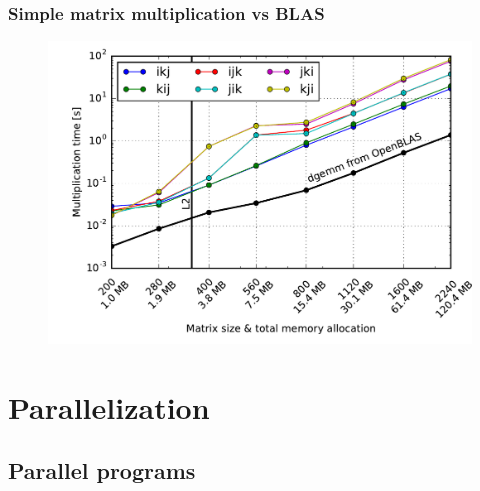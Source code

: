 \documentclass[usenames,dvipsnames,mathserif,compress]{beamer}
\begin{document}
\begin{frame}
  \frametitle{Simple matrix multiplication vs BLAS}
  \begin{figure}
    \includegraphics[width=.95\textwidth]{code/timings-matmul-blas.pdf}
  \end{figure}
\end{frame}


\section*{Parallelization}
\subsection*{Parallel programs}
\end{document}
